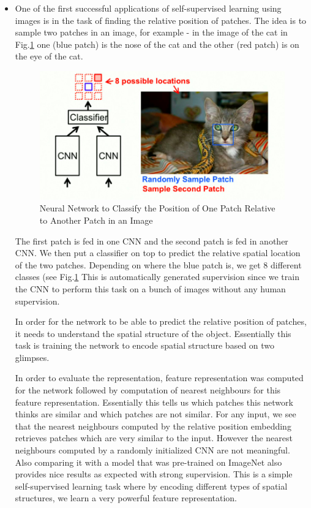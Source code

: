 \begin{itemize}
    
\item One of the first successful applications of self-supervised learning using images is in the task of finding the relative position of patches. The idea is to sample two patches in an image, for example - in the image of the cat in Fig.\ref{fig:relpatch} one (blue patch) is the nose of the cat and the other (red patch) is on the eye of the cat. 

\begin{figure}[H]
  \includegraphics[width=\linewidth]{lectures/13-a/RelativePosition.jpg}
  \caption{Neural Network to Classify the Position of One Patch Relative to Another Patch in an Image}
  \label{fig:relpatch}
\end{figure}

The first patch is fed in one CNN and the second patch is fed in another CNN. We then put a classifier on top to predict the relative spatial location of the two patches. Depending on where the blue patch is, we get 8 different classes (see Fig.\ref{fig:relpatch} This is automatically generated supervision since we train the CNN to perform this task on a bunch of images without any human supervision.

In order for the network to be able to predict the relative position of patches, it needs to understand the spatial structure of the object. Essentially this task is training the network to encode spatial structure based on two glimpses.

In order to evaluate the representation, feature representation was computed for the network followed by computation of nearest neighbours for this feature representation. Essentially this tells us which patches this network thinks are similar and which patches are not similar. For any input, we see that the nearest neighbours computed by the relative position embedding retrieves patches which are very similar to the input. However the nearest neighbours computed by a randomly initialized CNN are not meaningful. Also comparing it with a model that was pre-trained on ImageNet also provides nice results as expected with strong supervision. This is a simple self-supervised learning task where by encoding different types of spatial structures, we learn a very powerful feature representation.


\end{itemize}
